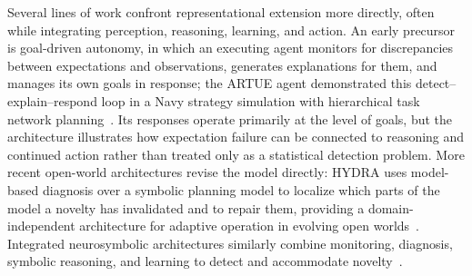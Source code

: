 Several lines of work confront representational extension more directly, often while integrating perception, reasoning, learning, and action.
An early precursor is goal-driven autonomy, in which an executing agent monitors for discrepancies between expectations and observations, generates explanations for them, and manages its own goals in response; the ARTUE agent demonstrated this detect--explain--respond loop in a Navy strategy simulation with hierarchical task network planning~\citep{molineaux2010gda}.
Its responses operate primarily at the level of goals, but the architecture illustrates how expectation failure can be connected to reasoning and continued action rather than treated only as a statistical detection problem.
More recent open-world architectures revise the model directly: HYDRA uses model-based diagnosis over a symbolic planning model to localize which parts of the model a novelty has invalidated and to repair them, providing a domain-independent architecture for adaptive operation in evolving open worlds~\citep{mohan2024domain}.
Integrated neurosymbolic architectures similarly combine monitoring, diagnosis, symbolic reasoning, and learning to detect and accommodate novelty~\citep{muhammad2021novelty,goel2024neurosymbolic}.

